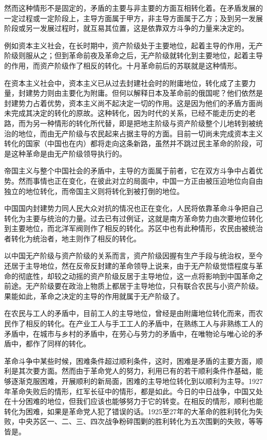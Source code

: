 然而这种情形不是固定的，矛盾的主要与非主要的方面互相转化着。在矛盾发展的一定过程或一定阶段上，主导方面属于甲方，非主导方面属于乙方；及到另一发展阶段或另一发展过程时，就互易其位置，这是依靠双方斗争的力量来决定的。

例如资本主义社会，在长时期中，资产阶级处于主要地位，起着主导的作用，无产阶级则服从之；但到革命前夜及革命之后，无产阶级就转化到主要地位，起着主导的作用，而资产阶级作了相反的转化。十月革命前后的苏联就是这种情形。

在资本主义社会中，资本主义已从过去封建社会时的附庸地位，转化成了主要力量，封建势力则由主要化为附庸。但何以解释日本及革命前的俄国呢？他们依然是封建势力占着优势，资本主义尚不起决定一切的作用。这是因为他们的矛盾方面尚未完成其决定的转化的原故。这种转化，因为时代的关系，已经不能走历史的老路，而为另一种情形的转化所代替，即是把地主阶级与资产阶级整个儿地转到被统治的地位，而由无产阶级与农民起来占据主导的方面。目前一切尚未完成资本主义转化的国家（中国也在内）都将走向这条新路，虽然并不跳过民主革命的阶段，可是这种革命是由无产阶级领导执行的。

帝国主义与整个中国社会的矛盾中，主导的方面属于前者，它在双方斗争中占着优势。然而事情也正在变化，在彼此对立的局面中，中国一方正由被压迫地位向自由独立的地位转化，而帝国主义则将转化到被打倒的地位。

中国国内封建势力同人民大众对抗的情况也正在变化，人民将依靠革命斗争把自己转化为主要与统治的力量。过去已有过例证，这就是南方革命势力由次要地位转化到主要地位，而北洋军阀则作了相反的转化。苏区中也有此种情形，农民由被统治者转化为统治者，地主则作了相反的转化。

以中国无产阶级与资产阶级的关系而言，资产阶级因握有生产手段与统治权，至今还居于主导地位，然在反帝反封建的革命领导上说来，由于无产阶级觉悟程度与革命的彻底性，却较之动摇的资产阶级反居于主导地位，这一点将影响到中国革命之前途。无产阶级要在政治上物质上都居于主导地位，只有联合农民与小资产阶级。果能如此，革命之决定的主导的作用就属于无产阶级了。

在农民与工人的矛盾中，目前工人的主导地位，曾经是由附庸地位转化而来，而农民作了相反的转化。在产业工人与手工工人的矛盾中，在熟练工人与非熟练工人的矛盾中，在城市与乡村的矛盾中，在劳心与劳力的矛盾中，在唯物论与唯心论的矛盾中，都作了同样的转化。

革命斗争中某些时候，困难条件超过顺利条件，这时，困难是矛盾的主要方面，顺利是其次要方面。然而由于革命党人的努力，利用已有的若干顺利条件作基础，能够逐渐克服困难，开展顺利的新局面，困难的主导地位转化到以顺利为主导。1927年革命失败后的情形，红军长征中的情形，都是如此。今日的中日战争，中国又处在十分困难的地位，但我们应该也能够努力于它的转变。在相反的情形，顺利也能转化为困难，如果是革命党人犯了错误的话。1925至27年的大革命的胜利转化为失败，中央苏区一、二、三、四次战争粉碎围剿的胜利转化为五次围剿的失败，等等皆是。


